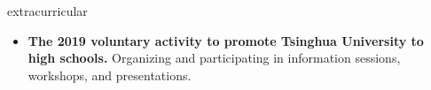 \documentclass{resume}
\begin{document}
        
    







\begin{ResumeSection}{extracurricular}
    \vspace{3pt}
    \begin{itemize}
        \item \textbf{The 2019 voluntary activity to promote Tsinghua University to high schools.} Organizing and participating in information sessions, workshops, and presentations.
    \end{itemize}
\end{ResumeSection}
\end{document}
